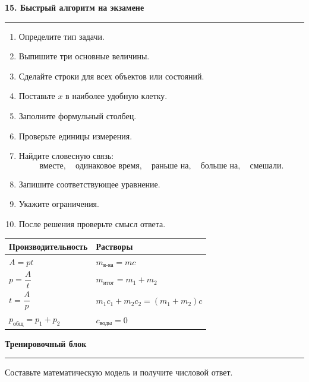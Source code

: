 \documentclass[a4paper,12pt]{article}
\newcommand{\topic}[1]{%
    \vspace{0.5em}
    {\Large\bfseries\color{darkaccent}#1}\par
    \vspace{0.25em}
    {\color{accent!55}\rule{\linewidth}{0.6pt}}\par
    \vspace{0.45em}
}
\begin{document}

\topic{15. Быстрый алгоритм на экзамене}

\begin{enumerate}
    \item Определите тип задачи.
    \item Выпишите три основные величины.
    \item Сделайте строки для всех объектов или состояний.
    \item Поставьте $x$ в наиболее удобную клетку.
    \item Заполните формульный столбец.
    \item Проверьте единицы измерения.
    \item Найдите словесную связь:
    \[
    \text{вместе},\quad
    \text{одинаковое время},\quad
    \text{раньше на},\quad
    \text{больше на},\quad
    \text{смешали}.
    \]
    \item Запишите соответствующее уравнение.
    \item Укажите ограничения.
    \item После решения проверьте смысл ответа.
\end{enumerate}

\vspace{0.4em}

\begin{center}
\renewcommand{\arraystretch}{1.4}
\begin{tabularx}{0.95\linewidth}{@{} X X @{}}
\toprule
\textbf{Производительность} & \textbf{Растворы} \\
\midrule
$A=pt$ &
$m_{\text{в-ва}}=mc$ \\

$p=\dfrac{A}{t}$ &
$m_{\text{итог}}=m_1+m_2$ \\

$t=\dfrac{A}{p}$ &
$m_1c_1+m_2c_2=(m_1+m_2)c$ \\

$p_{\text{общ}}=p_1+p_2$ &
$c_{\text{воды}}=0$ \\
\bottomrule
\end{tabularx}
\end{center}


\newpage
\thispagestyle{fancy}

\begin{center}
{\LARGE\bfseries\color{darkaccent}Тренировочный блок}

\vspace{0.25cm}

{\color{accent!55}\rule{0.76\linewidth}{0.7pt}}

\vspace{0.35cm}

{\small\color{muted}
Составьте математическую модель и получите числовой ответ.}
\end{center}
\end{document}
